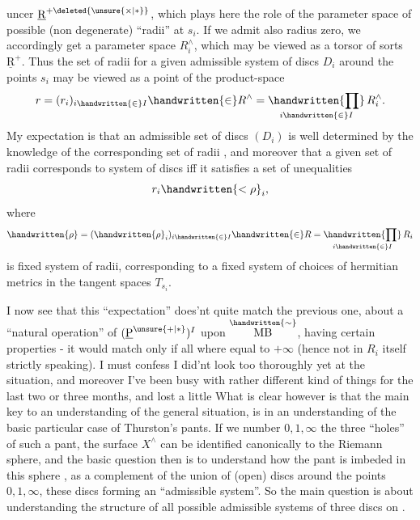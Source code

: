
uncer $\underline{\mathrm R}^{+\deleted{\unsure{\times|*}}}$, which plays here the role of the parameter space of  possible (non degenerate) ``radii'' at $s_i$. If we admit also radius zero, we accordingly get a parameter space $R_i^{\wedge}$, which may be viewed as a torsor of sorts  $\underline{\mathrm R}^{+}$. Thus the set of radii for a given admissible system of discs $D_i$ around the points $s_i$ may be viewed as a point of the product-space
\[
r=(r_i)_{i\handwritten{\in} I}\handwritten{\in} R^{\wedge}=\mathop{\handwritten{\prod}}\limits_{i\handwritten{\in} I} R_i^{\wedge}.
\]
My expectation is that an admissible set of discs $(D_i)$ is well determined by the knowledge of the corresponding set  of radii , and moreover that a given set  of radii  corresponds to  system of  discs iff it satisfies a set of unequalities
\[
r_i\handwritten{<\rho}_i,
\]
where
\[
\handwritten{\rho}=(\handwritten{\rho}_i)_{i\handwritten{\in} I}\handwritten{\in} R=\mathop{\handwritten{\prod}}\limits_{i\handwritten{\in} I} R_i
\]
is  fixed system of radii, corresponding to a fixed system of choices of hermitian metrics in the tangent spaces $T_{s_i}$.

I now see that this ``expectation'' does'nt quite match  the previous one, about a ``natural operation'' of $(\underline{\mathrm P}^{\unsure{+|*}})^I$ upon $\overset{\handwritten{\sim}}{\mathrm{MB}}$, having certain properties - it would match only if all  where equal to $+\infty$ (hence not in $R_i$ itself strictly speaking). I must confess I did'nt look too thoroughly yet at the situation, and moreover I've been busy with rather different kind of things for the last two or three months, and lost  a little  What is clear however is that the main key to an understanding of the general situation, is in an understanding of the basic particular case of Thurston's pants. If we number $0,1,\infty$ the three ``holes'' of such a pant, the surface $X^{\wedge}$ can be identified canonically to the Riemann sphere, and the basic question then is to understand how the pant is imbeded in this sphere \handwritten{$\Sigma$}, as a complement of  the union of (open) discs around the points $0,1,\infty$, these discs forming an ``admissible system''. So the main question is about understanding the structure of all possible admissible systems of three discs on \handwritten{$\Sigma$}.

